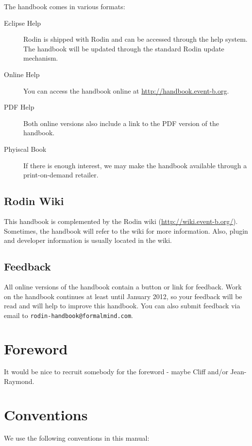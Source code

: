 \documentclass{book}
\begin{document}
The handbook comes in various formats:

\begin{description}
	\item[Eclipse Help] Rodin is shipped with Rodin and can be accessed through the help system.  The handbook will be updated through the standard Rodin update mechanism.
	\item[Online Help] You can access the handbook online at \url{http://handbook.event-b.org}.
	\item[PDF Help] Both online versions also include a link to the PDF version of the handbook.
	\item[Phyiscal Book] If there is enough interest, we may make the handbook available through a print-on-demand retailer.
\end{description}

\subsection{Rodin Wiki}
\label{rodin_wiki}

This handbook is complemented by the Rodin wiki (\url{http://wiki.event-b.org/}).  Sometimes, the handbook will refer to the wiki for more information.  Also, plugin and developer information is usually located in the wiki.

\subsection{Feedback}
\label{feedback}

All online versions of the handbook contain a button or link for feedback.  Work on the handbook continues at least until January 2012, so your feedback will be read and will help to improve this handbook.  You can also submit feedback via email to \texttt{rodin-handbook@formalmind.com}.

\section{Foreword}

It would be nice to recruit somebody for the foreword - maybe Cliff and/or Jean-Raymond.

\section{Conventions}
\label{conventions}

We use the following conventions in this manual:
\end{document}
